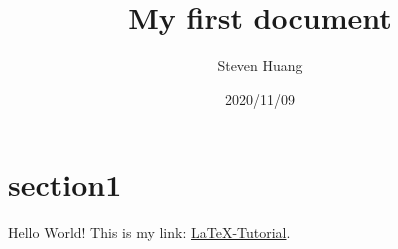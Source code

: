 \documentclass{article}
\title{ My first document}
\date{2020/11/09}
\author{Steven Huang}
\begin{document}

\section{section1}
Hello World!
This is my link: \href{http://www.latex-tutorial.com}{LaTeX-Tutorial}.
\end{document}
